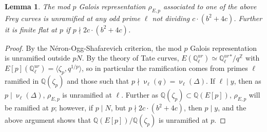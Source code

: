\documentclass[12pt]{amsart}
\newtheorem{lem}[thm]{Lemma}
\theoremstyle{definition}
\theoremstyle{remark}
\def\Q{{\mathbb Q}}
\def\Z{{\mathbb Z}}
\newcommand{\notdiv}{\nmid}
\begin{document}
\begin{lem}\label{unram}
The mod $p$ Galois representation $\rho_{E,p}$ associated to one of the above Frey curves is unramified at any odd prime $\ell$ not dividing $c \cdot (b^2+4c)$.  Further it is finite flat at $p$ if $p \notdiv 2c\cdot (b^2+4c)$.
\end{lem}
\begin{proof}
By the N\'{e}ron-Ogg-Shafarevich criterion, the mod $p$ Galois representation is unramified outside $pN$.  By the theory of Tate curves, $E({\Q}_\ell^{ur}) \simeq {\Q}_\ell^{ur}{}^\ast / q^{\Z}$ with $E[p]({\Q}_\ell^{ur}) = \langle \zeta_p, q^{1/p} \rangle$, so in particular the ramification comes from primes $\ell$ ramified in $\Q(\zeta_p)$ and those such that $p \notdiv \upnu_\ell(q) = \upnu_\ell(\Delta)$.  If $\ell \mid y$, then as $p \mid \upnu_\ell(\Delta)$, $\rho_{E,p}$ is unramified at $\ell$.  Further as $\Q(\zeta_p) \subset \Q(E[p])$, $\rho_{E,p}$ will be ramified at $p$; however, if $p \mid N$, but $p \notdiv 2c \cdot (b^2+4c)$, then $p \mid y$, and the above argument shows that $\Q(E[p]) / \Q(\zeta_p)$ is unramified at $p$.
\end{proof}
\end{document}
